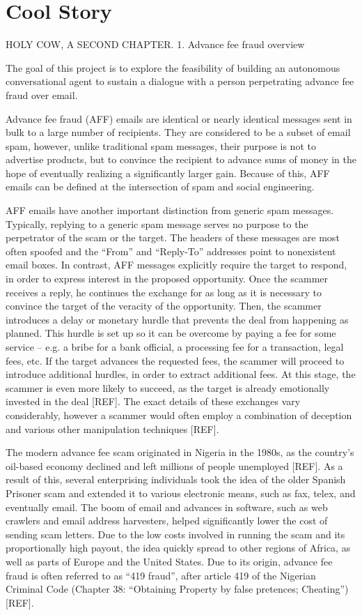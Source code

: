 \chapter{Cool Story}

HOLY COW, A SECOND CHAPTER.
1.	Advance fee fraud overview

The goal of this project is to explore the feasibility of building an autonomous conversational agent to sustain a dialogue with a person perpetrating advance fee fraud over email.

Advance fee fraud (AFF) emails are identical or nearly identical messages sent in bulk to a large number of recipients. They are considered to be a subset of email spam, however, unlike traditional spam messages, their purpose is not to advertise products, but to convince the recipient to advance sums of money in the hope of eventually realizing a significantly larger gain. Because of this, AFF emails can be defined at the intersection of spam and social engineering.

AFF emails have another important distinction from generic spam messages. Typically, replying to a generic spam message serves no purpose to the perpetrator of the scam or the target. The headers of these messages are most often spoofed and the “From” and “Reply-To” addresses point to nonexistent email boxes. In contrast, AFF messages explicitly require the target to respond, in order to express interest in the proposed opportunity. Once the scammer receives a reply, he continues the exchange for as long as it is necessary to convince the target of the veracity of the opportunity. Then, the scammer introduces a delay or monetary hurdle that prevents the deal from happening as planned. This hurdle is set up so it can be overcome by paying a fee for some service – e.g. a bribe for a bank official, a processing fee for a transaction, legal fees, etc. If the target advances the requested fees, the scammer will proceed to introduce additional hurdles, in order to extract additional fees. At this stage, the scammer is even more likely to succeed, as the target is already emotionally invested in the deal [REF]. The exact details of these exchanges vary considerably, however a scammer would often employ a combination of deception and various other manipulation techniques [REF].

The modern advance fee scam originated in Nigeria in the 1980s, as the country's oil-based economy declined and left millions of people unemployed [REF]. As a result of this, several enterprising individuals took the idea of the older Spanish Prisoner scam and extended it to various electronic means, such as fax, telex, and eventually email. The boom of email and advances in software, such as web crawlers and email address harvesters, helped significantly lower the cost of sending scam letters. Due to the low costs involved in running the scam and its proportionally high payout, the idea quickly spread to other regions of Africa, as well as parts of Europe and the United States. Due to its origin, advance fee fraud is often referred to as “419 fraud”, after article 419 of the Nigerian Criminal Code (Chapter 38: “Obtaining Property by false pretences; Cheating”) [REF].

